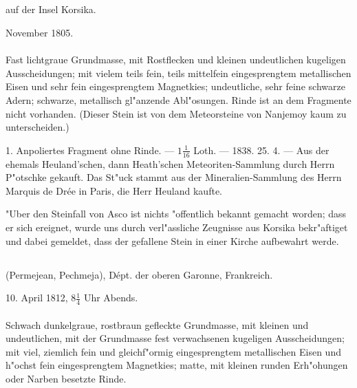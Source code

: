\documentclass[a4paper, 11pt, oneside, polutonikogreek, german]{article}
\begin{document}
\subsection[\frakfamily{Asco.}]{}
\begin{center}

auf der Insel Korsika.

November 1805.
\end{center}
\paragraph{}
Fast lichtgraue Grundmasse, mit Rostflecken und kleinen undeutlichen kugeligen Ausscheidungen; mit vielem teils fein, teils mittelfein eingesprengtem metallischen Eisen und sehr fein eingesprengtem Magnetkies; undeutliche, sehr feine schwarze Adern; schwarze, metallisch gl"anzende Abl"osungen. Rinde ist an dem Fragmente nicht vorhanden. (Dieser Stein ist von dem Meteorsteine von Nanjemoy kaum zu unterscheiden.)

1. Anpoliertes Fragment ohne Rinde. --- $1\frac{1}{16}$ Loth. --- 1838. 25. 4. --- Aus der ehemals Heuland'schen, dann Heath'schen Meteoriten-Sammlung durch Herrn P"otschke gekauft. Das St"uck stammt aus der Mineralien-Sammlung des Herrn Marquis de Drée in Paris, die Herr Heuland kaufte.

\setlength{\leftskip}{10mm}
\setlength{\parindent}{0pt}

{\footnotesize "Uber den Steinfall von Asco ist nichts "offentlich bekannt gemacht worden; dass er sich ereignet, wurde uns durch verl"assliche Zeugnisse aus Korsika bekr"aftiget und dabei gemeldet, dass der gefallene Stein in einer Kirche aufbewahrt werde.}

\setlength{\leftskip}{0pt}
\setlength{\parindent}{20pt}

\subsection{}
\begin{center}

(Permejean, Pechmeja), Dépt. der oberen Garonne, Frankreich.

10. April 1812, $8\frac{1}{4}$ Uhr Abends.
\end{center}
\paragraph{}
Schwach dunkelgraue, rostbraun gefleckte Grundmasse, mit kleinen und undeutlichen, mit der Grundmasse fest verwachsenen kugeligen Ausscheidungen; mit viel, ziemlich fein und gleichf"ormig eingesprengtem metallischen Eisen und h"ochst fein eingesprengtem Magnetkies; matte, mit kleinen runden Erh"ohungen oder Narben besetzte Rinde.
\end{document}
